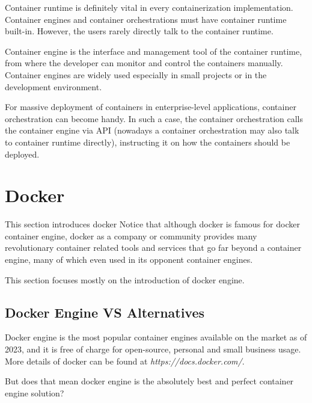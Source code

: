 Container runtime is definitely vital in every containerization implementation. Container engines and container orchestrations must have container runtime built-in. However, the users rarely directly talk to the container runtime. 

Container engine is the interface and management tool of the container runtime, from where the developer can monitor and control the containers manually. Container engines are widely used especially in small projects or in the development environment.

For massive deployment of containers in enterprise-level applications, container orchestration can become handy. In such a case, the container orchestration calls the container engine via API (nowadays a container orchestration may also talk to container runtime directly), instructing it on how the containers should be deployed.

\section{Docker} \label{ch:vac:sec:dc}

This section introduces docker Notice that although docker is famous for docker container engine, docker as a company or community provides many revolutionary container related tools and services that go far beyond a container engine, many of which even used in its opponent container engines.

This section focuses mostly on the introduction of docker engine.

\subsection{Docker Engine VS Alternatives}

Docker engine is the most popular container engines available on the market as of 2023, and it is free of charge for open-source, personal and small business usage. More details of docker can be found at \textit{https://docs.docker.com/}.

But does that mean docker engine is the absolutely best and perfect container engine solution?

